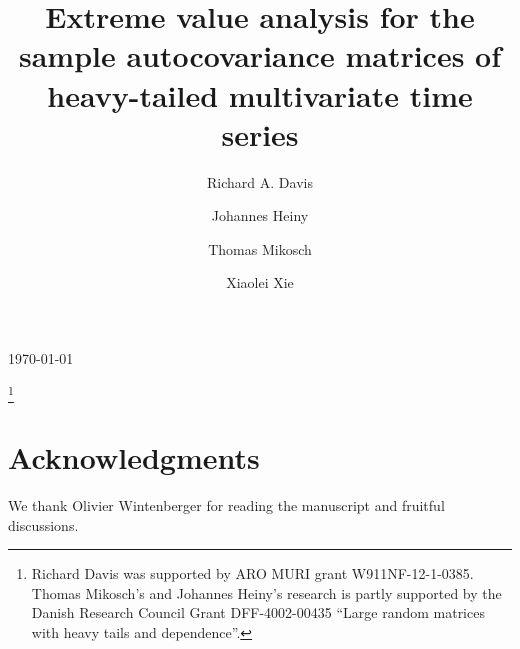 \documentclass[11pt,reqno]{amsart}
\newcommand{\1}{\mathbf{1}}
\newcommand{\0}{\boldsymbol{0}}
\newcommand{\4}{\mathchoice{\mskip1.5mu}{\mskip1.5mu}{}{}}
\newcommand{\5}{\mathchoice{\mskip-1.5mu}{\mskip-1.5mu}{}{}}
\newcommand{\2}{\penalty250\mskip\thickmuskip\mskip-\thinmuskip} %
\begin{document}
\today
%
\title[Extreme value analysis for the sample autocovariance matrices of time series]
{Extreme value analysis for the sample autocovariance matrices of heavy-tailed multivariate time series}
\thanks{Richard Davis
was supported by ARO MURI grant W911NF-12-1-0385. Thomas Mikosch's and Johannes Heiny's research is partly supported by the Danish Research Council Grant DFF-4002-00435 ``Large random matrices with heavy tails and dependence''.}
\author[Richard A. Davis]{Richard A. Davis}
\author[Johannes Heiny]{Johannes Heiny}
\author[Thomas Mikosch]{Thomas Mikosch}
\author[Xiaolei Xie]{Xiaolei Xie}
\address{Department of Statistics,
Columbia University,
1255 Amsterdam Ave.
New York, NY 10027, U.S.A.}
\address{Department  of Mathematics,
University of Copenhagen,
Universitetsparken 5,
DK-2100 Copenhagen,
Denmark}

\maketitle



\section*{Acknowledgments}\setcounter{equation}{0}

We thank Olivier Wintenberger for reading the manuscript and fruitful discussions.
\end{document}
